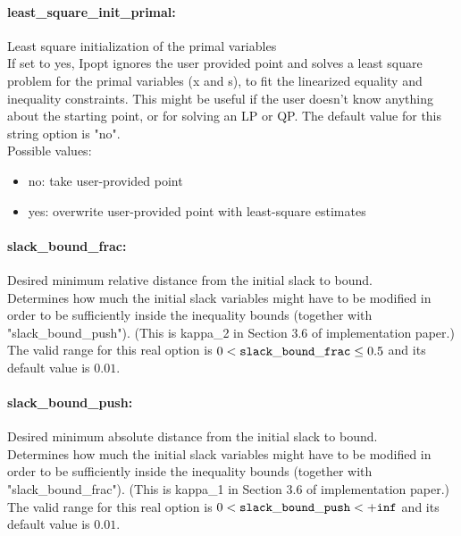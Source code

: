 \paragraph{least\_square\_init\_primal:}\label{sec:least_square_init_primal} Least square initialization of the primal variables $\;$ \\
 If set to yes, Ipopt ignores the user provided
point and solves a least square problem for the
primal variables (x and s), to fit the linearized
equality and inequality constraints.  This might
be useful if the user doesn't know anything about
the starting point, or for solving an LP or QP.
The default value for this string option is "no".
\\ 
Possible values:
\begin{itemize}
   \item no: take user-provided point
   \item yes: overwrite user-provided point with least-square
estimates
\end{itemize}

\paragraph{slack\_bound\_frac:}\label{sec:slack_bound_frac} Desired minimum relative distance from the initial slack to bound. $\;$ \\
 Determines how much the initial slack variables
might have to be modified in order to be
sufficiently inside the inequality bounds
(together with "slack\_bound\_push").  (This is
kappa\_2 in Section 3.6 of implementation paper.) The valid range for this real option is 
$0 <  {\tt slack\_bound\_frac } \le 0.5$
and its default value is $0.01$.


\paragraph{slack\_bound\_push:}\label{sec:slack_bound_push} Desired minimum absolute distance from the initial slack to bound. $\;$ \\
 Determines how much the initial slack variables
might have to be modified in order to be
sufficiently inside the inequality bounds
(together with "slack\_bound\_frac").  (This is
kappa\_1 in Section 3.6 of implementation paper.) The valid range for this real option is 
$0 <  {\tt slack\_bound\_push } <  {\tt +inf}$
and its default value is $0.01$.


